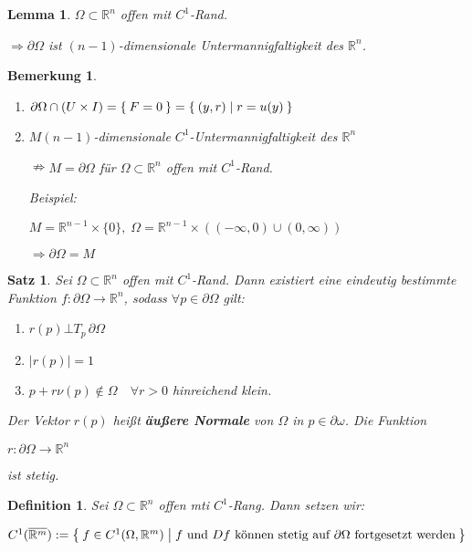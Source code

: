 \documentclass[11pt]{memoir}
\theoremstyle{changebreak}
\newtheorem{Definition}{Definition}[chapter]
\newtheorem{Bemerkung}{Bemerkung}[chapter]
\newtheorem{Lemma}{Lemma}[chapter]
\newtheorem{Satz}{Satz}[chapter]
\begin{document}
\begin{Lemma}
$\Omega \subset \mathbb R^n$ offen mit $C^1$-Rand.
\begin{center}
	$\Rightarrow \partial \Omega$ ist $(n-1)$-dimensionale Untermannigfaltigkeit des $\mathbb R^n$.
\end{center}
\end{Lemma}


\begin{Bemerkung}
\begin{enumerate}
	\item $\partial \Omega \cap (U \times I) = \Set{F=0} = \Set{(y,r) | r = u(y)}$
	\item $M (n-1)$-dimensionale $C^1$-Untermannigfaltigkeit des $\mathbb R^n$ 
	\par
	$\nRightarrow M = \partial \Omega$ für $\Omega \subset \mathbb R^n$ offen mit $C^1$-Rand. 
	\par
	\emph{Beispiel}: 
	\par
	$M = \mathbb R^{n-1} \times \{0\}, \; \Omega = \mathbb R^{n-1} \times \left((-\infty, 0) \cup (0, \infty)\right)$
	\par
	$\Rightarrow \partial\Omega = M$
\end{enumerate}
\end{Bemerkung}

\begin{Satz}
Sei $\Omega \subset \mathbb R^n$ offen mit $C^1$-Rand. Dann existiert eine eindeutig bestimmte Funktion $f: \partial\Omega \rightarrow \mathbb R^n$, sodass $\forall p \in \partial \Omega$ gilt:
\begin{enumerate}
	\item $r(p) \bot T_p \, \partial \Omega$
	\item $|r(p)| = 1$
	\item $p + r \nu(p) \notin \Omega \quad \forall r > 0$ hinreichend klein.
\end{enumerate}
Der Vektor $r(p)$ heißt \textbf{äußere Normale} von $\Omega$ in $p \in \partial \omega$. Die Funktion 
\begin{center}
	$r: \partial \Omega \rightarrow \mathbb R^n$ 
\end{center}
ist stetig.
\end{Satz}


\begin{Definition}
Sei $\Omega \subset \mathbb R^n$ offen mti $C^1$-Rang. Dann setzen wir:
\begin{center}
	$C^1(\overline {\mathbb R^m}) := \Set{f \in C^1(\Omega, \mathbb R^m) | f \text{ und }Df \text{ können stetig auf }\partial \Omega \text{ fortgesetzt werden}}$
\end{center}
\end{Definition}
\end{document}
